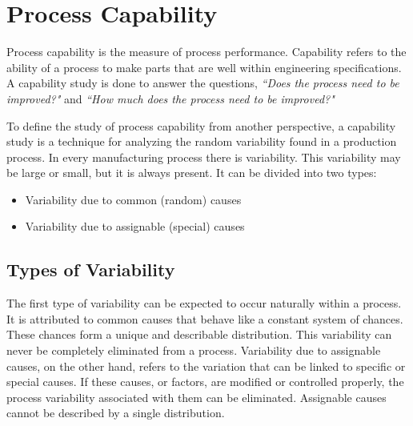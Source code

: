 \documentclass[SPC-MASTER.tex]{subfiles}
\begin{document}
\Large
\section{Process Capability}
Process capability is the measure of process performance. Capability refers to the ability of a process to make parts that are well within engineering specifications. A capability study is done to answer the questions, \textit{``Does the process need to be improved?"} and  \textit{``How much does the process need to be improved?"}

To define the study of process capability from another perspective, a capability study is a technique for analyzing the random variability found in a production process. In every manufacturing process there is variability. This variability may be large or small, but it is always present. It can be divided into two types:

\begin{itemize}
\item Variability due to common (random) causes
\item Variability due to assignable (special) causes
\end{itemize}
\subsection{Types of Variability}
The first type of variability can be expected to occur naturally within a process. It is attributed to common causes that behave like a constant system of chances. These chances form a unique and describable distribution. This variability can never be completely eliminated from a process. Variability due to assignable causes, on the other hand, refers to the variation that can be linked to specific or special causes. If these causes, or factors, are modified or controlled properly, the process variability associated with them can be eliminated. Assignable causes cannot be described by a single distribution.
\newpage
\end{document}
